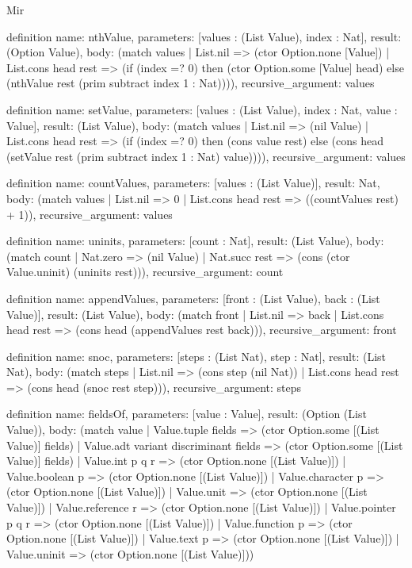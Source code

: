 \begin{lexlean}{Mir}
\begin{semanticmodule}
definition{
  name: nthValue,
  parameters: [values : (List Value), index : Nat],
  result: (Option Value),
  body: (match values
    | List.nil => (ctor Option.none [Value])
    | List.cons head rest => (if (index =? 0) then (ctor Option.some [Value] head) else (nthValue rest (prim subtract index 1 : Nat)))),
  recursive_argument: values
}

definition{
  name: setValue,
  parameters: [values : (List Value), index : Nat, value : Value],
  result: (List Value),
  body: (match values
    | List.nil => (nil Value)
    | List.cons head rest => (if (index =? 0) then (cons value rest) else (cons head (setValue rest (prim subtract index 1 : Nat) value)))),
  recursive_argument: values
}

definition{
  name: countValues,
  parameters: [values : (List Value)],
  result: Nat,
  body: (match values | List.nil => 0 | List.cons head rest => ((countValues rest) + 1)),
  recursive_argument: values
}

definition{
  name: uninits,
  parameters: [count : Nat],
  result: (List Value),
  body: (match count
    | Nat.zero => (nil Value)
    | Nat.succ rest => (cons (ctor Value.uninit) (uninits rest))),
  recursive_argument: count
}

definition{
  name: appendValues,
  parameters: [front : (List Value), back : (List Value)],
  result: (List Value),
  body: (match front
    | List.nil => back
    | List.cons head rest => (cons head (appendValues rest back))),
  recursive_argument: front
}

definition{
  name: snoc,
  parameters: [steps : (List Nat), step : Nat],
  result: (List Nat),
  body: (match steps
    | List.nil => (cons step (nil Nat))
    | List.cons head rest => (cons head (snoc rest step))),
  recursive_argument: steps
}

definition{
  name: fieldsOf,
  parameters: [value : Value],
  result: (Option (List Value)),
  body: (match value
    | Value.tuple fields => (ctor Option.some [(List Value)] fields)
    | Value.adt variant discriminant fields => (ctor Option.some [(List Value)] fields)
    | Value.int p q r => (ctor Option.none [(List Value)])
    | Value.boolean p => (ctor Option.none [(List Value)])
    | Value.character p => (ctor Option.none [(List Value)])
    | Value.unit => (ctor Option.none [(List Value)])
    | Value.reference r => (ctor Option.none [(List Value)])
    | Value.pointer p q r => (ctor Option.none [(List Value)])
    | Value.function p => (ctor Option.none [(List Value)])
    | Value.text p => (ctor Option.none [(List Value)])
    | Value.uninit => (ctor Option.none [(List Value)]))
}


\end{semanticmodule}
\end{lexlean}
